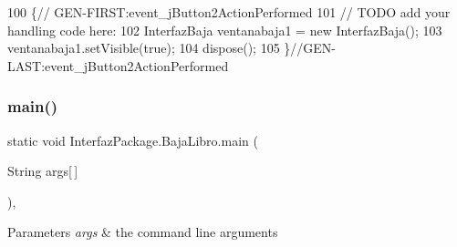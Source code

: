\begin{DoxyCode}
100                                                                          \{\textcolor{comment}{//
      GEN-FIRST:event\_jButton2ActionPerformed}
101         \textcolor{comment}{// TODO add your handling code here:}
102         InterfazBaja ventanabaja1 = \textcolor{keyword}{new} InterfazBaja();
103         ventanabaja1.setVisible(\textcolor{keyword}{true});
104         dispose();
105     \}\textcolor{comment}{//GEN-LAST:event\_jButton2ActionPerformed}
\end{DoxyCode}
\mbox{\label{class_interfaz_package_1_1_baja_libro_a8915e7da833ff9189bfa77b49bb5d10b}} 
\subsubsection{\texorpdfstring{main()}{main()}}
{\footnotesize\ttfamily static void Interfaz\+Package.\+Baja\+Libro.\+main (\begin{DoxyParamCaption}\item[{String}]{args\mbox{[}$\,$\mbox{]} }\end{DoxyParamCaption})\hspace{0.3cm}{\ttfamily [inline]}, {\ttfamily [static]}}


\begin{DoxyParams}{Parameters}
{\em args} & the command line arguments \\
\hline
\end{DoxyParams}

